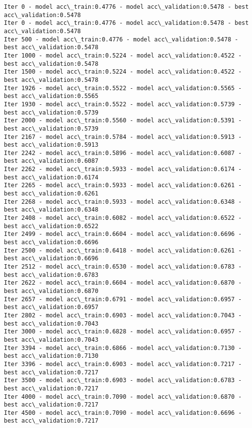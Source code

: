 \documentclass[a4paper,12pt]{article}
\begin{document}
    \begin{Verbatim}[commandchars=\\\{\},fontsize=\small]
Iter 0 - model acc\_train:0.4776 - model acc\_validation:0.5478 - best acc\_validation:0.5478
Iter 0 - model acc\_train:0.4776 - model acc\_validation:0.5478 - best acc\_validation:0.5478
Iter 500 - model acc\_train:0.4776 - model acc\_validation:0.5478 - best acc\_validation:0.5478
Iter 1000 - model acc\_train:0.5224 - model acc\_validation:0.4522 - best acc\_validation:0.5478
Iter 1500 - model acc\_train:0.5224 - model acc\_validation:0.4522 - best acc\_validation:0.5478
Iter 1926 - model acc\_train:0.5522 - model acc\_validation:0.5565 - best acc\_validation:0.5565
Iter 1930 - model acc\_train:0.5522 - model acc\_validation:0.5739 - best acc\_validation:0.5739
Iter 2000 - model acc\_train:0.5560 - model acc\_validation:0.5391 - best acc\_validation:0.5739
Iter 2167 - model acc\_train:0.5784 - model acc\_validation:0.5913 - best acc\_validation:0.5913
Iter 2242 - model acc\_train:0.5896 - model acc\_validation:0.6087 - best acc\_validation:0.6087
Iter 2262 - model acc\_train:0.5933 - model acc\_validation:0.6174 - best acc\_validation:0.6174
Iter 2265 - model acc\_train:0.5933 - model acc\_validation:0.6261 - best acc\_validation:0.6261
Iter 2268 - model acc\_train:0.5933 - model acc\_validation:0.6348 - best acc\_validation:0.6348
Iter 2408 - model acc\_train:0.6082 - model acc\_validation:0.6522 - best acc\_validation:0.6522
Iter 2499 - model acc\_train:0.6604 - model acc\_validation:0.6696 - best acc\_validation:0.6696
Iter 2500 - model acc\_train:0.6418 - model acc\_validation:0.6261 - best acc\_validation:0.6696
Iter 2512 - model acc\_train:0.6530 - model acc\_validation:0.6783 - best acc\_validation:0.6783
Iter 2622 - model acc\_train:0.6604 - model acc\_validation:0.6870 - best acc\_validation:0.6870
Iter 2657 - model acc\_train:0.6791 - model acc\_validation:0.6957 - best acc\_validation:0.6957
Iter 2802 - model acc\_train:0.6903 - model acc\_validation:0.7043 - best acc\_validation:0.7043
Iter 3000 - model acc\_train:0.6828 - model acc\_validation:0.6957 - best acc\_validation:0.7043
Iter 3394 - model acc\_train:0.6866 - model acc\_validation:0.7130 - best acc\_validation:0.7130
Iter 3396 - model acc\_train:0.6903 - model acc\_validation:0.7217 - best acc\_validation:0.7217
Iter 3500 - model acc\_train:0.6903 - model acc\_validation:0.6783 - best acc\_validation:0.7217
Iter 4000 - model acc\_train:0.7090 - model acc\_validation:0.6870 - best acc\_validation:0.7217
Iter 4500 - model acc\_train:0.7090 - model acc\_validation:0.6696 - best acc\_validation:0.7217
    \end{Verbatim}
\end{document}
